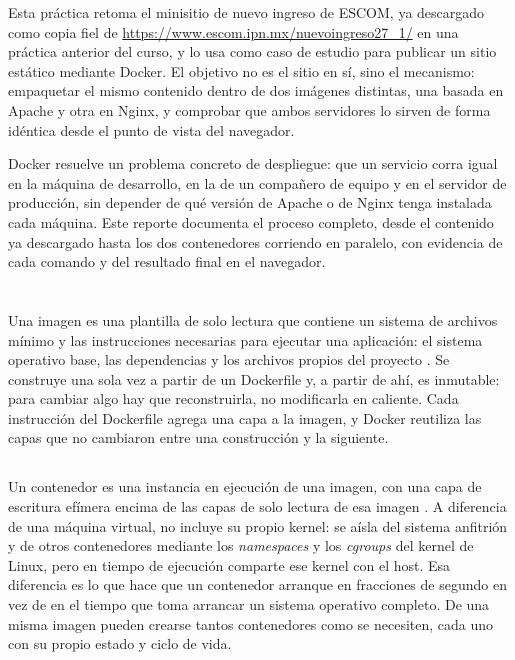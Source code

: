 \documentclass[10pt,a4paper]{article}
\begin{document}
Esta práctica retoma el minisitio de nuevo ingreso de ESCOM, ya descargado como copia fiel de \url{https://www.escom.ipn.mx/nuevoingreso27_1/} en una práctica anterior del curso, y lo usa como caso de estudio para publicar un sitio estático mediante Docker. El objetivo no es el sitio en sí, sino el mecanismo: empaquetar el mismo contenido dentro de dos imágenes distintas, una basada en Apache y otra en Nginx, y comprobar que ambos servidores lo sirven de forma idéntica desde el punto de vista del navegador.

Docker resuelve un problema concreto de despliegue: que un servicio corra igual en la máquina de desarrollo, en la de un compañero de equipo y en el servidor de producción, sin depender de qué versión de Apache o de Nginx tenga instalada cada máquina. Este reporte documenta el proceso completo, desde el contenido ya descargado hasta los dos contenedores corriendo en paralelo, con evidencia de cada comando y del resultado final en el navegador.

\section{\color{colorIPN}{Conceptos teóricos}}

\subsection{ \color{colorESCOM}{Imagen Docker}}

Una imagen es una plantilla de solo lectura que contiene un sistema de archivos mínimo y las instrucciones necesarias para ejecutar una aplicación: el sistema operativo base, las dependencias y los archivos propios del proyecto \cite{docker2024overview}. Se construye una sola vez a partir de un Dockerfile y, a partir de ahí, es inmutable: para cambiar algo hay que reconstruirla, no modificarla en caliente. Cada instrucción del Dockerfile agrega una capa a la imagen, y Docker reutiliza las capas que no cambiaron entre una construcción y la siguiente.

\subsection{ \color{colorESCOM}{Contenedor}}

Un contenedor es una instancia en ejecución de una imagen, con una capa de escritura efímera encima de las capas de solo lectura de esa imagen \cite{docker2024overview}. A diferencia de una máquina virtual, no incluye su propio kernel: se aísla del sistema anfitrión y de otros contenedores mediante los \textit{namespaces} y los \textit{cgroups} del kernel de Linux, pero en tiempo de ejecución comparte ese kernel con el host. Esa diferencia es lo que hace que un contenedor arranque en fracciones de segundo en vez de en el tiempo que toma arrancar un sistema operativo completo. De una misma imagen pueden crearse tantos contenedores como se necesiten, cada uno con su propio estado y ciclo de vida.
\end{document}
